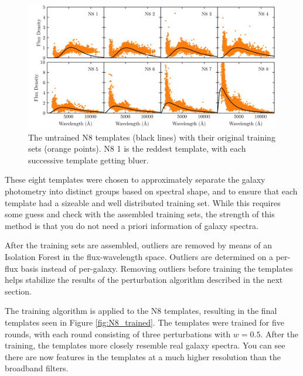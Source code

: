 \begin{figure}
    \centering
    \includegraphics{figures/N8_untrained.png}
    \caption{The untrained N8 templates (black lines) with their original training sets (orange points). N8 1 is the reddest template, with each successive template getting bluer.}
    \label{fig:N8_untrained}
\end{figure}

These eight templates were chosen to approximately separate the galaxy photometry into distinct groups based on spectral shape, and to ensure that each template had a sizeable and well distributed training set. 
While this requires some guess and check with the assembled training sets, the strength of this method is that you do not need a priori information of galaxy spectra.

After the training sets are assembled, outliers are removed by means of an Isolation Forest in the flux-wavelength space. 
Outliers are determined on a per-flux basis instead of per-galaxy. 
Removing outliers before training the templates helps stabilize the results of the perturbation algorithm described in the next section.

The training algorithm is applied to the N8 templates, resulting in the final templates seen in Figure \ref{fig:N8_trained}. 
The templates were trained for five rounds, with each round consisting of three perturbations with $w=0.5$. 
After the training, the templates more closely resemble real galaxy spectra. 
You can see there are now features in the templates at a much higher resolution than the broadband filters. 

